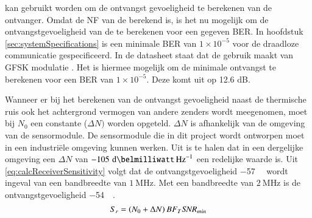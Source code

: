  kan gebruikt worden om de ontvangst gevoeligheid te berekenen van de ontvanger. Omdat de NF van de \mcu berekend is, is het nu mogelijk om de ontvangstgevoeligheid van de \mcu te berekenen voor een gegeven BER. In hoofdstuk \ref{sec:systemSpecifications} is een minimale BER van $1\times10^{-5}$ voor de draadloze communicatie gespecificeerd. In de datasheet staat dat de \mcu gebruik maakt van GFSK modulatie \cite{nrf52810}. Het is hiermee mogelijk om de minimale ontvangst \SNR te berekenen voor een BER van $1\times10^{-5}$. Deze komt uit op 12.6 dB.

Wanneer er  bij het berekenen van de ontvangst gevoeligheid naast de thermische ruis ook het achtergrond vermogen van andere zenders wordt meegenomen, moet bij $N_0$ een constante ($\Delta N)$ worden opgeteld. $\Delta N$ is afhankelijk van de omgeving van de sensormodule. De sensormodule die in dit project wordt ontworpen moet in een industriële omgeving kunnen werken. Uit \cite{kumar2020spectrum} is te halen dat in een dergelijke omgeving een $\Delta N$ van $-105\,\,\si{\deci\belmilliwatt\,\hertz^{-1}}$ een redelijke waarde is. Uit \cref{eq:calcReceiverSensitivity} volgt dat de ontvangstgevoeligheid \qty{-57}{\deci\belmilliwatt} wordt ingeval van een bandbreedte van $\SI{1}{\mega\hertz}$. Met een bandbreedte van $\SI{2}{\mega\hertz}$ is de ontvangstgevoeligheid \qty{-54}{\deci\belmilliwatt}.
\begin{equation}\label{eq:calcReceiverSensitivity}
    S_r=\left(N_0+\Delta N\right)BF_T \SNR_{min}
    \tagaddtext{[\si{\deci\belmilliwatt}]}
\end{equation}


